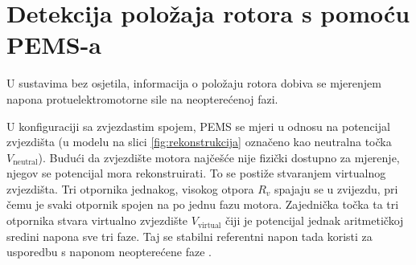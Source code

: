 \documentclass[diplomskirad]{fer}
\begin{document}
\section{Detekcija položaja rotora s pomoću PEMS-a}

U sustavima bez osjetila, informacija o položaju rotora dobiva se mjerenjem
napona protuelektromotorne sile na neopterećenoj fazi.

U konfiguraciji sa zvjezdastim spojem, PEMS se mjeri u odnosu na potencijal
zvjezdišta (u modelu na slici \ref{fig:rekonstrukcija} označeno kao neutralna
točka $V_{\text{neutral}}$). Budući da zvjezdište motora najčešće nije fizički
dostupno za mjerenje, njegov se potencijal mora rekonstruirati. To se postiže
stvaranjem virtualnog zvjezdišta. Tri otpornika jednakog, visokog otpora $R_v$
spajaju se u zvijezdu, pri čemu je svaki otpornik spojen na po jednu fazu
motora. Zajednička točka ta tri otpornika stvara virtualno zvjezdište
$V_{\text{virtual}}$ čiji je potencijal jednak aritmetičkoj sredini napona sve
tri faze. Taj se stabilni referentni napon tada koristi za usporedbu s naponom
neopterećene faze \cite{ST_AN1946}.
\end{document}
